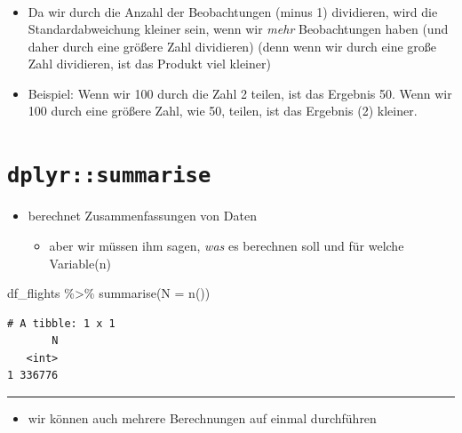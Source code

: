 \documentclass[
  letterpaper,
  DIV=11]{scrartcl}
\newenvironment{Shaded}{\begin{snugshade}}{\end{snugshade}}
\newcommand{\AttributeTok}[1]{\textcolor[rgb]{0.40,0.45,0.13}{#1}}
\newcommand{\FunctionTok}[1]{\textcolor[rgb]{0.28,0.35,0.67}{#1}}
\newcommand{\NormalTok}[1]{\textcolor[rgb]{0.00,0.23,0.31}{#1}}
\newcommand{\SpecialCharTok}[1]{\textcolor[rgb]{0.37,0.37,0.37}{#1}}
\providecommand{\tightlist}{%
  \setlength{\itemsep}{0pt}\setlength{\parskip}{0pt}}\usepackage{longtable,booktabs,array}
\begin{document}
\begin{tcolorbox}
\begin{align}
\end{align}

\begin{itemize}
\item
  Da wir durch die Anzahl der Beobachtungen (minus 1) dividieren, wird
  die Standardabweichung kleiner sein, wenn wir \emph{mehr}
  Beobachtungen haben (und daher durch eine größere Zahl dividieren)
  (denn wenn wir durch eine große Zahl dividieren, ist das Produkt viel
  kleiner)
\item
  Beispiel: Wenn wir 100 durch die Zahl 2 teilen, ist das Ergebnis 50.
  Wenn wir 100 durch eine größere Zahl, wie 50, teilen, ist das Ergebnis
  (2) kleiner.
\end{itemize}

\end{tcolorbox}

\hypertarget{dplyrsummarise}{%
\section{\texorpdfstring{\texttt{dplyr::summarise}}{dplyr::summarise}}\label{dplyrsummarise}}

\begin{itemize}
\tightlist
\item
  berechnet Zusammenfassungen von Daten

  \begin{itemize}
  \tightlist
  \item
    aber wir müssen ihm sagen, \emph{was} es berechnen soll und für
    welche Variable(n)
  \end{itemize}
\end{itemize}

\begin{Shaded}
\begin{Highlighting}[]
\NormalTok{df\_flights }\SpecialCharTok{\%\textgreater{}\%} 
  \FunctionTok{summarise}\NormalTok{(}\AttributeTok{N =} \FunctionTok{n}\NormalTok{())}
\end{Highlighting}
\end{Shaded}

\begin{verbatim}
# A tibble: 1 x 1
       N
   <int>
1 336776
\end{verbatim}

\begin{center}\rule{0.5\linewidth}{0.5pt}\end{center}

\begin{itemize}
\tightlist
\item
  wir können auch mehrere Berechnungen auf einmal durchführen
\end{itemize}
\end{document}
